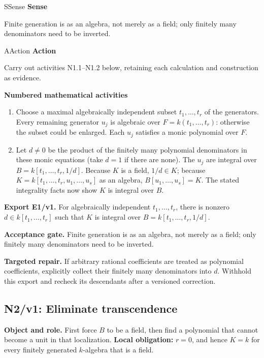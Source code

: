 \documentclass[preprint,12pt,aps,pra,showkeys,amsmath,amssymb,superscriptaddress,floatfix]{revtex4-2}
\theoremstyle{definition}
\theoremstyle{remark}
\newcommand{\mmfaculty}[3]{%
 \begin{mmfacultybox}{#1}{#2}
 {\sffamily\bfseries\color{MMBlue}#2}\par\smallskip #3
 \end{mmfacultybox}}
\newcommand{\field}[2]{\par\smallskip\noindent\textbf{#1.} #2\par}
\begin{document}
\mmfaculty{S}{Sense}{Finite generation is as an algebra, not merely as a field; only finitely
many denominators need to be inverted.}

\mmfaculty{A}{Action}{Carry out activities N1.1--N1.2 below, retaining each calculation and
construction as evidence.}

\smallskip\noindent\textbf{Numbered mathematical activities}

\begin{enumerate}[label=N1.\arabic*,leftmargin=3.4em]

\item Choose a maximal algebraically independent subset \(t_1,\ldots,t_r\) of
the generators. Every remaining generator \(u_j\) is algebraic over
\(F=k(t_1,\ldots,t_r)\): otherwise the subset could be enlarged. Each
\(u_j\) satisfies a monic polynomial over \(F\).

\item Let \(d\ne0\) be the product of the finitely many polynomial
denominators in these monic equations (take \(d=1\) if there are none).
The \(u_j\) are integral over \(B=k[t_1,\ldots,t_r,1/d]\). Because \(K\)
is a field, \(1/d\in K\); because \(K=k[t_1,\ldots,t_r,u_1,\ldots,u_s]\)
as an algebra, \(B[u_1,\ldots,u_s]=K\). The stated integrality facts now
show \(K\) is integral over \(B\).

\end{enumerate}

\field{Export E1/v1}{For algebraically independent \(t_1,\ldots,t_r\), there is nonzero
\(d\in k[t_1,\ldots,t_r]\) such that \(K\) is integral over
\(B=k[t_1,\ldots,t_r,1/d]\).}

\field{Acceptance gate}{Finite generation is as an algebra, not merely as a field; only finitely
many denominators need to be inverted.}

\field{Targeted repair}{If arbitrary rational coefficients are treated as polynomial
coefficients, explicitly collect their finitely many denominators into
\(d\). Withhold this export and recheck its descendants after a
versioned correction.}

\endgroup

\clearpage

\subsection{N2/v1: Eliminate transcendence}

\field{Object and role}{First force \(B\) to be a field, then find a polynomial that cannot
become a unit in that localization. \textbf{Local obligation:} \(r=0\),
and hence \(K=k\) for every finitely generated \(k\)-algebra that is a
field.}
\end{document}
